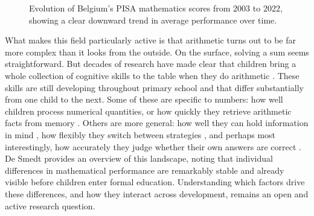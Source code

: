 \begin{figure}
    \centering


    \caption{Evolution of Belgium's PISA mathematics scores from 2003 to 2022, showing a clear downward trend in average performance over time. \cite{globaleconomy2022belgium}}
    \label{fig:pisa_scores_belgium}
\end{figure}

What makes this field particularly active is that arithmetic turns out to be far more complex than it looks from the outside. On the surface, solving a sum seems straightforward. But decades of research have made clear that children bring a whole collection of cognitive skills to the table when they do arithmetic \cite{geary_chapter_2016}. These skills are still developing throughout primary school and that differ substantially from one child to the next. Some of these are specific to numbers: how well children process numerical quantities, or how quickly they retrieve arithmetic facts from memory \cite{vanbinst_chapter_2016}. Others are more general: how well they can hold information in mind \cite{zhang2022working}, how flexibly they switch between strategies \cite{hickendorff2022flexibility}, and perhaps most interestingly, how accurately they judge whether their own answers are correct \cite{rinne_knowing_2014}. De Smedt \cite{desmedt2022} provides an overview of this landscape, noting that individual differences in mathematical performance are remarkably stable and already visible before children enter formal education. Understanding which factors drive these differences, and how they interact across development, remains an open and active research question. 

